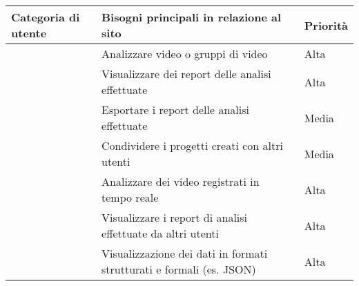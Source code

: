 \begin{table}[H]
	\centering
	\caption{I bisogni degli utenti di Emotionally.}
	\label{tab:bisogni-utenti}
	\begin{longtable}{@{}|>{\centering\arraybackslash}m{}|m{}|>{\centering\arraybackslash}m{}|@{}}
		\hline
		\rowcolor{emotionally-color}
		{\color{white} \textbf{Categoria di utente}}   & {\color{white} \textbf{Bisogni principali in relazione al sito}}     & {\color{white} \textbf{Priorità}} \\\hline
		\endfirsthead
		\cellcolor{white!0}                            & Analizzare video o gruppi di video                                   & Alta                              \\
		\cellcolor{white!0}                            & Visualizzare dei report delle analisi effettuate                     & Alta                              \\
		\cellcolor{white!0}                            & Esportare i report delle analisi effettuate                          & Media                             \\
		\cellcolor{white!0}                            & Condividere i progetti creati con altri utenti                       & Media                             \\
		\multirow{-5}{*}{Analista}                     & Analizzare dei video registrati in tempo reale                       & Alta                              \\
		\cellcolor{gray!25}                            & Visualizzare i report di analisi effettuate da altri utenti          & Alta                              \\
		\multirow{-2}{*}{\cellcolor{gray!25} Designer} & Visualizzazione dei dati in formati strutturati e formali (es. JSON) & Alta                              \\
		\hline
	\end{longtable}
\end{table}
